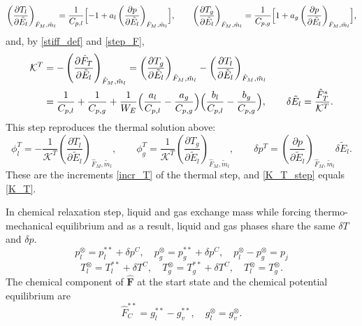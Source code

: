 \begin{equation}\label{dT_dQ}
\left(\frac{\partial T_l}{\partial\tilde{E}_l}\right)_{\hat{F}_M,\tilde{m}_l}=\frac1{C_{p,l}}\Bigl[-1+a_l\left(\frac{\partial p}{\partial\tilde{E}_l}\right)_{\hat{F}_M,\tilde{m}_l}\Bigr],\qquad
\left(\frac{\partial T_g}{\partial\tilde{E}_l}\right)_{\hat{F}_M,\tilde{m}_l}=\frac1{C_{p,g}}\Bigl[1+a_g\left(\frac{\partial p}{\partial\tilde{E}_l}\right)_{\hat{F}_M,\tilde{m}_l}\Bigr],
\end{equation}
and, by \eqref{stiff_def} and \eqref{step_F},
\begin{equation}\label{K_T_step}
\begin{split}
\mathcal{K}^T&=-\left(\frac{\partial \hat{F}_T}{\partial\tilde{E}_l}\right)_{\hat{F}_M,\tilde{m}_l}=\left(\frac{\partial T_g}{\partial\tilde{E}_l}\right)_{\hat{F}_M,\tilde{m}_l}-\left(\frac{\partial T_l}{\partial\tilde{E}_l}\right)_{\hat{F}_M,\tilde{m}_l}\\
&=\frac1{C_{p,l}}+\frac1{C_{p,g}}+\frac1{W_E}\Bigl(\frac{a_l}{C_{p,l}}-\frac{a_g}{C_{p,g}}\Bigr)\Bigl(\frac{b_l}{C_{p,l}}-\frac{b_g}{C_{p,g}}\Bigr),\qquad
\delta\tilde{E}_l=\frac{\hat{F}_T^*}{\mathcal{K}^T}.
\end{split}
\end{equation}
This step reproduces the thermal solution above:
\begin{equation}
\phi_l^T=-\frac1{\mathcal{K}^T}\left(\frac{\partial T_l}{\partial\tilde{E}_l}\right)_{\hat{F}_M,\tilde{m}_l},\qquad
\phi_g^T=\frac1{\mathcal{K}^T}\left(\frac{\partial T_g}{\partial\tilde{E}_l}\right)_{\hat{F}_M,\tilde{m}_l},\qquad
\delta p^T=\left(\frac{\partial p}{\partial\tilde{E}_l}\right)_{\hat{F}_M,\tilde{m}_l}\delta\tilde{E}_l .
\end{equation}
These are the increments \eqref{incr_T} of the thermal step, and \eqref{K_T_step} equals \eqref{K_T}.

In chemical relaxation step, liquid and gas exchange mass while forcing thermo-mechanical equilibrium and as a result, liquid and gas phases share the same $\delta T$ and $\delta p$.
\begin{equation}
p_l^{\otimes} = p_l^{**} + \delta p^C, \quad p_g^{\otimes} = p_g^{**} + \delta p^C, \quad p_l^{\otimes} - p_g^{\otimes} = p_{j}
\end{equation}
\begin{equation}
T_l^{\otimes} = T_l^{**} + \delta T^C, \quad T_g^{\otimes} = T_g^{**} + \delta T^C, \quad T_l^{\otimes} = T_g^{\otimes}.
\end{equation}
The chemical component of $\hat{\boldsymbol{F}}$ at the start state and the chemical potential equilibrium are
\begin{equation}\label{F_C}
\hat{F}_C^{**} = g_l^{**} - g_v^{**}, \quad g_l^{\otimes} = g_v^{\otimes}.
\end{equation}

